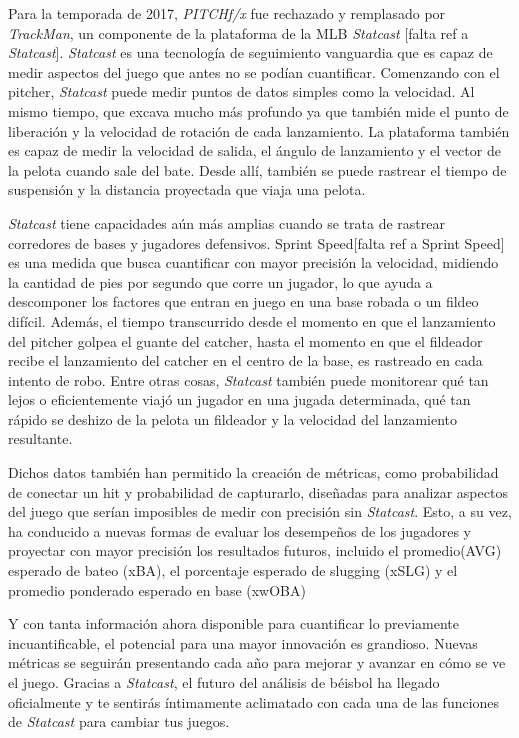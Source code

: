 Para la temporada de 2017, \textit{PITCHf/x} fue rechazado y remplasado por \textit{TrackMan}, un componente de la plataforma de la MLB \textit{Statcast} [falta ref a \textit{Statcast}]. \textit{Statcast} es una tecnología de seguimiento vanguardia que es capaz de medir aspectos del juego que antes no se podían cuantificar. Comenzando con el pitcher, \textit{Statcast} puede medir puntos de datos simples como la velocidad. Al mismo tiempo, que excava mucho más profundo ya que también mide el punto de liberación y la velocidad de rotación de cada lanzamiento. La plataforma también es capaz de medir la velocidad de salida, el ángulo de lanzamiento y el vector de la pelota cuando sale del bate. Desde allí, también se puede rastrear el tiempo de suspensión y la distancia proyectada que viaja una pelota.

\textit{Statcast} tiene capacidades aún más amplias cuando se trata de rastrear corredores de bases y jugadores defensivos. Sprint Speed[falta ref a Sprint Speed] es una medida que busca cuantificar con mayor precisión la velocidad, midiendo la cantidad de pies por segundo que corre un jugador, lo que ayuda a descomponer los factores que entran en juego en una base robada o un fildeo difícil. Además, el tiempo transcurrido desde el momento en que el lanzamiento del pitcher golpea el guante del catcher, hasta el momento en que el fildeador recibe el lanzamiento del catcher en el centro de la base, es rastreado en cada intento de robo. Entre otras cosas, \textit{Statcast} también puede monitorear qué tan lejos o eficientemente viajó un jugador en una jugada determinada, qué tan rápido se deshizo de la pelota un fildeador y la velocidad del lanzamiento resultante.

Dichos datos también han permitido la creación de métricas, como probabilidad de conectar un hit y probabilidad de capturarlo, diseñadas para analizar aspectos del juego que serían imposibles de medir con precisión sin \textit{Statcast}. Esto, a su vez, ha conducido a nuevas formas de evaluar los desempeños de los jugadores y proyectar con mayor precisión los resultados futuros, incluido el promedio(AVG) esperado de bateo (xBA), el porcentaje esperado de slugging (xSLG) y el promedio ponderado esperado en base (xwOBA)

Y con tanta información ahora disponible para cuantificar lo previamente incuantificable, el potencial para una mayor innovación es grandioso. Nuevas métricas se seguirán presentando cada año para mejorar y avanzar en cómo se ve el juego. Gracias a \textit{Statcast}, el futuro del análisis de béisbol ha llegado oficialmente y te sentirás íntimamente aclimatado con cada una de las funciones de \textit{Statcast} para cambiar tus juegos.


